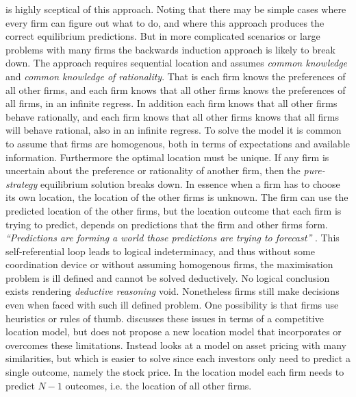 \documentclass[preprint, 12pt]{elsarticle}
\begin{document}
\citet[chapter~11]{Arthur_2014} is highly sceptical of this approach. Noting that there may be simple cases where every firm can figure out what to do, and where this approach produces the correct equilibrium predictions. But in more complicated scenarios or large problems with many firms the backwards induction approach is likely to break down. The approach requires sequential location and assumes \emph{common knowledge} and \emph{common knowledge of rationality}. That is each firm knows the preferences of all other firms, and each firm knows that all other firms knows the preferences of all firms, in an infinite regress. In addition each firm knows that all other firms behave rationally, and each firm knows that all other firms knows that all firms will behave rational, also in an infinite regress. To solve the model it is common to assume that firms are homogenous, both in terms of expectations and available information. Furthermore the optimal location must be unique. If any firm is uncertain about the preference or rationality of another firm, then the \emph{pure-strategy} equilibrium solution breaks down. In essence when a firm has to choose its own location, the location of the other firms is unknown. The firm can use the predicted location of the other firms, but the location outcome that each firm is trying to predict, depends on predictions that the firm and other firms form. \emph{``Predictions are forming a world those predictions are trying to forecast''} \citep[p.~175]{Arthur_2014}. This self-referential loop leads to logical indeterminacy, and thus without some coordination device or without assuming homogenous firms, the maximisation problem is ill defined and cannot be solved deductively. No logical conclusion exists rendering \emph{deductive reasoning} void. Nonetheless firms still make decisions even when faced with such ill defined problem. One possibility is that firms use heuristics or rules of thumb. \citet[chapter~11]{Arthur_2014} discusses these issues in terms of a competitive location model, but does not propose a new location model that incorporates or overcomes these limitations. Instead \citet[chapter~11]{Arthur_2014} looks at a model on asset pricing with many similarities, but which is easier to solve since each investors only need to predict a single outcome, namely the stock price. In the location model each firm needs to predict $N-1$ outcomes, i.e. the location of all other firms. 
\end{document}
